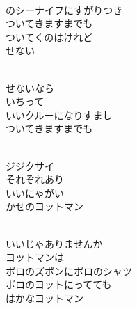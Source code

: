 \documentclass[10pt,b5j]{tarticle} %
\begin{document}
\vspace{1.0em} %
\newcommand{\linespace}{0.4em} %
\newcommand{\blocksize}{0.33\hsize} %
\newcommand{\itemmargin}{3em} %
\begin{enumerate} %
    \setlength{\itemindent}{\itemmargin} %
    \begin{minipage}[c]{\blocksize}
    
        \vspace{\linespace}
        \item~\\
        のシーナイフにすがりつき\\
        ついてきますまでも\\
        ついてくのはけれど\\
        せない
        
        \vspace{\linespace}
        \item~\\
        せないなら\\
        いちって\\
        いいクルーになりすまし\\
        ついてきますまでも
        
        \vspace{\linespace}
        \item~\\
        ジジクサイ\\
        それぞれあり\\
        いいにゃがい\\
        かせのヨットマン
        
    \end{minipage}
    \begin{minipage}[c]{\blocksize}
        
        \vspace{\linespace}
        \item~\\
        いいじゃありませんか\\
        ヨットマンは\\
        ボロのズボンにボロのシャツ\\
        ボロのヨットにってても\\
        はかなヨットマン
        

\end{minipage}
\end{enumerate}
\end{document}
